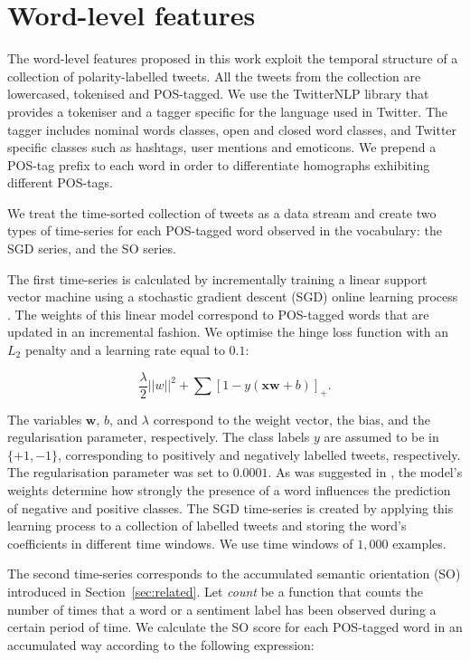 \documentclass{sig-alternate}
\begin{document}
\section{Word-level features}\label{sec:feat}

The word-level features proposed in this work exploit the temporal structure of a collection of polarity-labelled tweets. All the tweets from the collection are lowercased, tokenised and POS-tagged. We use the TwitterNLP library \cite{twitterNLP} that provides a  tokeniser and a tagger specific for the language used in Twitter. The tagger includes  nominal words classes, open and closed word classes, and Twitter specific classes such as hashtags, user mentions and emoticons. We prepend a POS-tag prefix to each word in order to differentiate homographs exhibiting different POS-tags.

We  treat the time-sorted collection of tweets as a data stream and create two types of time-series for each POS-tagged word observed in the vocabulary: the SGD series, and the SO series.

The first time-series is calculated by incrementally training a linear support vector machine using a stochastic gradient descent (SGD) online learning process \cite{Zhang2004}. The weights of this linear model correspond to POS-tagged words that are updated in an incremental fashion. We  optimise the hinge loss function with an $L_2$ penalty and a learning rate equal to $0.1$:
 
\begin{equation}\label{eq:sgd}
\frac{\lambda}{2}||w||^2+\sum [1- y (\mathbf{xw} +b) ]_{+}.
\end{equation}

The variables $\mathbf{w}$, $b$, and $\lambda$ correspond to the weight vector, the bias, and the regularisation parameter, respectively. The class labels $y$ are assumed to be in $\{+1,-1\}$, corresponding to positively and negatively labelled tweets, respectively. The regularisation parameter was set to $0.0001$.  As was suggested in \cite{bifet2010}, the model's weights determine how strongly the presence of a word influences the prediction of negative and positive classes.  The SGD time-series is created by applying this learning process to a collection of labelled tweets and storing the word's coefficients in different time windows. We use time windows of $1,000$ examples.  

The second time-series corresponds to the accumulated semantic orientation (SO) introduced in Section~\ref{sec:related}. Let \emph{count} be a function that counts the number of times that a word or a sentiment label has been observed during a certain period of time. We calculate the SO score for each POS-tagged word in an accumulated way according to the following expression:   
\end{document}
